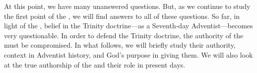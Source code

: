 At this point, we have many unanswered questions. But, as we continue to study the first point of the , we will find answers to all of these questions. So far, in light of the , belief in the Trinity doctrine—as a Seventh-day Adventist—becomes very questionable. In order to defend the Trinity doctrine, the authority of the  must be compromised. In what follows, we will briefly study their authority, context in Adventist history, and God’s purpose in giving them. We will also look at the true authorship of the  and their role in present days.

